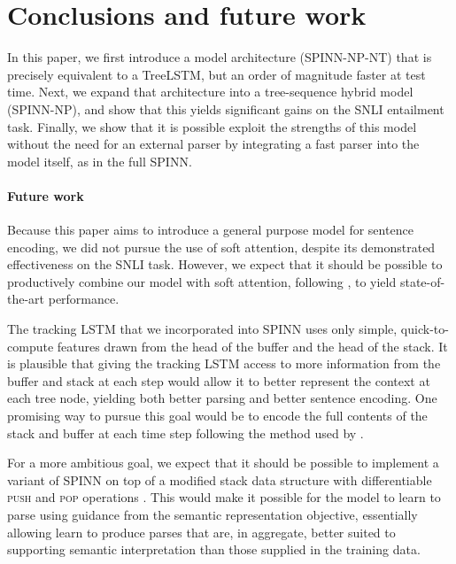 \documentclass[11pt]{article}
\begin{document}
\vspace{10em}

\section{Conclusions and future work}

In this paper, we first introduce a model architecture (SPINN-NP-NT) that is precisely equivalent to a TreeLSTM, but an order of magnitude faster at test time. Next, we expand that architecture into a tree-sequence hybrid model (SPINN-NP), and show that this yields significant gains on the SNLI entailment task. Finally, we show that it is possible exploit the strengths of this model without the need for an external parser by integrating a fast parser into the model itself, as in the full SPINN.

\paragraph{Future work} Because this paper aims to introduce a general purpose model for sentence encoding, we did not pursue the use of soft attention, despite its demonstrated effectiveness on the SNLI task. However, we expect that it should be possible to productively combine our model with soft attention, following \citet{cheng2016long}, to yield state-of-the-art performance.

The tracking LSTM that we incorporated into SPINN uses only simple, quick-to-compute features drawn from the head of the buffer and the head of the stack. It is plausible that giving the tracking LSTM access to more information from the buffer and stack at each step would allow it to better represent the context at each tree node, yielding both better parsing and better sentence encoding. One promising way to pursue this goal would be to encode the full contents of the stack and buffer at each time step following the method used by \citet{dyer-EtAl:2015:ACL-IJCNLP}.

For a more ambitious goal, we expect that it should be possible to implement a variant of SPINN on top of a modified stack data structure with differentiable \textsc{push} and \textsc{pop} operations \citep[as in][]{grefenstette2015learning,joulin2015inferring}. This would make it possible for the model to learn to parse using guidance from the semantic representation objective, essentially allowing learn to produce parses that are, in aggregate, better suited to supporting semantic interpretation than those supplied in the training data. 
\end{document}
